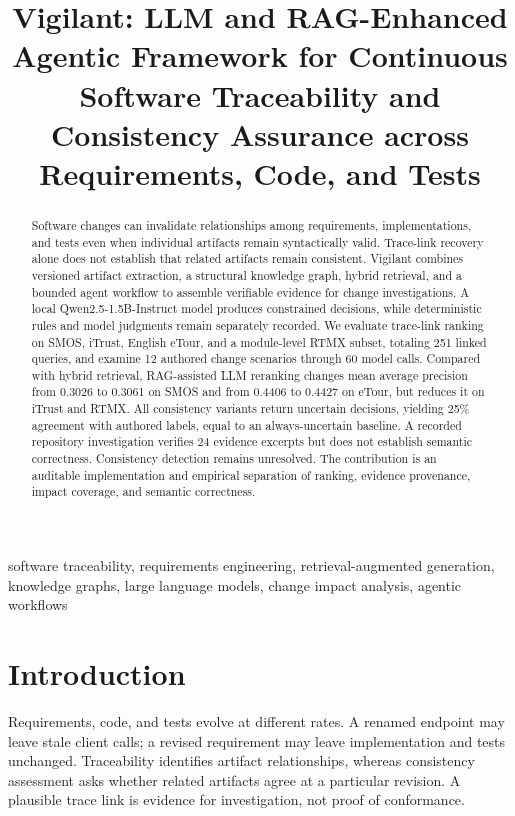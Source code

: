 \documentclass[conference,letterpaper,10pt]{IEEEtran}
\begin{document}
\title{Vigilant: LLM and RAG-Enhanced Agentic Framework for Continuous Software Traceability and Consistency Assurance across Requirements, Code, and Tests}
\author{}
\maketitle
\begin{abstract}
Software changes can invalidate relationships among requirements, implementations, and tests even when individual artifacts remain syntactically valid. Trace-link recovery alone does not establish that related artifacts remain consistent. Vigilant combines versioned artifact extraction, a structural knowledge graph, hybrid retrieval, and a bounded agent workflow to assemble verifiable evidence for change investigations. A local Qwen2.5-1.5B-Instruct model produces constrained decisions, while deterministic rules and model judgments remain separately recorded. We evaluate trace-link ranking on SMOS, iTrust, English eTour, and a module-level RTMX subset, totaling 251 linked queries, and examine 12 authored change scenarios through 60 model calls. Compared with hybrid retrieval, RAG-assisted LLM reranking changes mean average precision from 0.3026 to 0.3061 on SMOS and from 0.4406 to 0.4427 on eTour, but reduces it on iTrust and RTMX. All consistency variants return uncertain decisions, yielding 25\% agreement with authored labels, equal to an always-uncertain baseline. A recorded repository investigation verifies 24 evidence excerpts but does not establish semantic correctness. Consistency detection remains unresolved. The contribution is an auditable implementation and empirical separation of ranking, evidence provenance, impact coverage, and semantic correctness.
\end{abstract}
\begin{IEEEkeywords}
software traceability, requirements engineering, retrieval-augmented generation, knowledge graphs, large language models, change impact analysis, agentic workflows
\end{IEEEkeywords}
\section{Introduction}
Requirements, code, and tests evolve at different rates. A renamed endpoint may leave stale client calls; a revised requirement may leave implementation and tests unchanged. Traceability identifies artifact relationships, whereas consistency assessment asks whether related artifacts agree at a particular revision. A plausible trace link is evidence for investigation, not proof of conformance.
\end{document}
